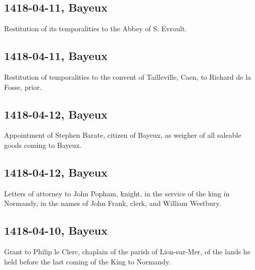 \documentclass[a4paper,12pt,twoside]{book}
\begin{document}
                
                \subsection{1418-04-11, Bayeux}
                
                
                     Restitution of its temporalities to the Abbey of S. Evroult.
                  
                
                \subsection{1418-04-11, Bayeux}
                
                
                     Restitution of temporalities to the convent of Tailleville, Caen, to Richard de la Fosse, prior.
                  
                
                \subsection{1418-04-12, Bayeux}
                
                
                     Appointment of Stephen Barate, citizen of Bayeux, as weigher of all saleable goods coming to Bayeux.
                  
                
                \subsection{1418-04-12, Bayeux}
                
                
                     Letters of attorney to John Popham, knight, in the service of the king in Normandy, in the names of John Frank, clerk, and William Westbury.
                  
                
                \subsection{1418-04-10, Bayeux}
                
                
                     Grant to Philip le Clerc, chaplain of the parish of Lion-sur-Mer, of the lands he held before the last coming of the King to Normandy.
                  
\end{document}
